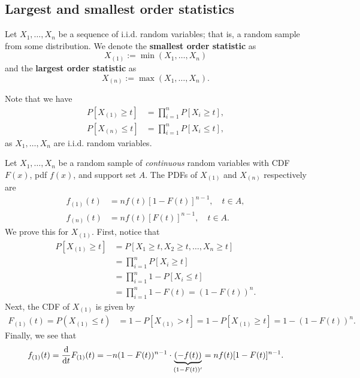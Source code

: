 \documentclass[10pt]{article}
\theoremstyle{newstyle}
\begin{document}
\subsection{Largest and smallest order statistics}

Let $X_1, \dots, X_n$ be a sequence of i.i.d. random variables; that is, a random sample 
from some distribution. We denote the {\bf smallest order statistic} as 
\[ X_{(1)} := \min(X_1, \dots, X_n) \]
and the {\bf largest order statistic} as 
\[ X_{(n)} := \max(X_1, \dots, X_n). \]

Note that we have 
\begin{align*} 
P[X_{(1)} \geq t] &= \prod_{i=1}^n P[X_i \geq t], \\
P[X_{(n)} \leq t] &= \prod_{i=1}^n P[X_i \leq t],
\end{align*} 
as $X_1, \dots, X_n$ are i.i.d. random variables.

Let $X_1, \dots, X_n$ be a random sample of {\it continuous} random variables with CDF 
$F(x)$, pdf $f(x)$, and support set $A$. The PDFs of $X_{(1)}$ and $X_{(n)}$ respectively are 
\begin{align*}
    f_{(1)}(t) &= nf(t)[1-F(t)]^{n-1}, \quad t \in A, \\
    f_{(n)}(t) &= nf(t)[F(t)]^{n-1}, \quad t \in A.
\end{align*}
We prove this for $X_{(1)}$. First, notice that 
\begin{align*}
    P[X_{(1)} \geq t] &= P[X_1 \geq t, X_2 \geq t, \dots, X_n \geq t] \\
    &= \prod_{i=1}^n P[X_i \geq t] \\
    &= \prod_{i=1}^n 1 - P[X_i \leq t] \\
    &= \prod_{i=1}^n 1 - F(t) = (1-F(t))^n. 
\end{align*}
Next, the CDF of $X_{(1)}$ is given by 
\begin{align*}
    F_{(1)}(t) = P(X_{(1)} \leq t) &= 1-P[X_{(1)} > t] 
    = 1-P[X_{(1)} \geq t] 
    = 1-(1-F(t))^n.
\end{align*}
Finally, we see that 
\[ f_{(1)}(t) = \frac{\rm d}{{\rm d}t} F_{(1)}(t) = -n(1-F(t))^{n-1} \cdot \underbrace{(-f(t))}_{(1-F(t))'} = nf(t)[1-F(t)]^{n-1}. \]
\end{document}
